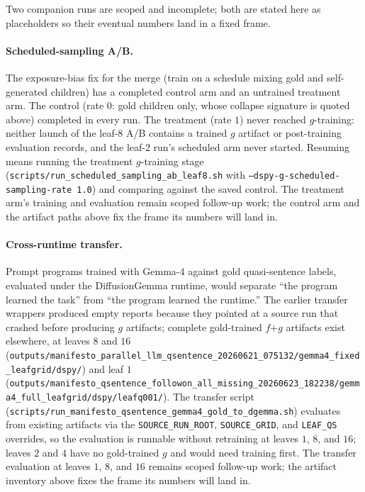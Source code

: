 Two companion runs are scoped and incomplete; both are stated here as
placeholders so their eventual numbers land in a fixed frame.

\paragraph{Scheduled-sampling A/B.} The exposure-bias fix for the
merge (train on a schedule mixing gold and self-generated children)
has a completed control arm and an untrained treatment arm. The
control (rate $0$: gold children only, whose collapse signature is
quoted above) completed in every run. The treatment (rate $1$) never
reached $g$-training: neither launch of the leaf-$8$ A/B contains a
trained $g$ artifact or post-training evaluation records, and the
leaf-$2$ run's scheduled arm never started. Resuming means running
the treatment $g$-training stage
(\texttt{scripts/run\_scheduled\_sampling\_ab\_leaf8.sh} with
\texttt{--dspy-g-scheduled-sampling-rate 1.0}) and comparing against
the saved control. The treatment arm's training and evaluation remain
scoped follow-up work; the control arm and the artifact paths above
fix the frame its numbers will land in.

\paragraph{Cross-runtime transfer.} Prompt programs trained with
Gemma-4 against gold quasi-sentence labels, evaluated under the
DiffusionGemma runtime, would separate ``the program learned the
task'' from ``the program learned the runtime.'' The earlier transfer
wrappers produced empty reports because they pointed at a source run
that crashed before producing $g$ artifacts; complete gold-trained
$f$+$g$ artifacts exist elsewhere, at leaves $8$ and $16$
(\texttt{outputs/manifesto\_parallel\_llm\_qsentence\_20260621\_075132/gemma4\_fixed\_leafgrid/dspy/})
and leaf $1$
(\texttt{outputs/manifesto\_qsentence\_followon\_all\_missing\_20260623\_182238/gemma4\_full\_leafgrid/dspy/leafq001/}).
The transfer script
(\texttt{scripts/run\_manifesto\_qsentence\_gemma4\_gold\_to\_dgemma.sh})
evaluates from existing artifacts via the \texttt{SOURCE\_RUN\_ROOT},
\texttt{SOURCE\_GRID}, and \texttt{LEAF\_QS} overrides, so the
evaluation is runnable without retraining at leaves $1$, $8$, and
$16$; leaves $2$ and $4$ have no gold-trained $g$ and would need
training first. The transfer evaluation at leaves $1$, $8$, and $16$
remains scoped follow-up work; the artifact inventory above fixes the
frame its numbers will land in.
